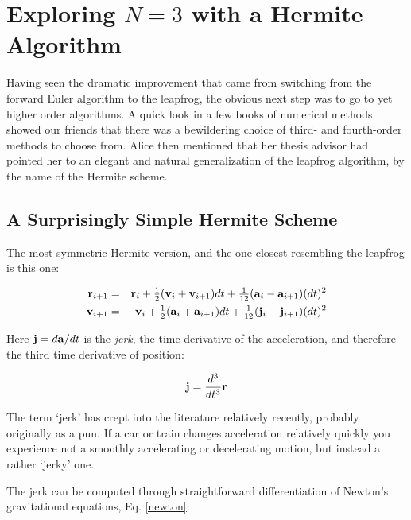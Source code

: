 \chapter{Exploring $N = 3$ with a Hermite Algorithm}

Having seen the dramatic improvement that came from switching from the
forward Euler algorithm to the leapfrog, the obvious next step was to
go to yet higher order algorithms.  A quick look in a few books of
numerical methods showed our friends that there was a bewildering
choice of third- and fourth-order methods to choose from.  Alice then
mentioned that her thesis advisor had pointed her to an elegant and
natural generalization of the leapfrog algorithm, by the name of the
Hermite scheme.

\section{A Surprisingly Simple Hermite Scheme}

The most symmetric Hermite version, and the one closest resembling the
leapfrog is this one:

\def\half{{\textstyle\frac{1}{2}}}
\def\quarter{{\textstyle\frac{1}{4}}}
\def\one#1{{\textstyle\frac{1}{#1}}}
\def\three#1{{\textstyle\frac{3}{#1}}}
\def\seven#1{{\textstyle\frac{7}{#1}}}

\begin{eqnarray}
\br_{i+1} & = & \br_i + \half(\bv_i + \bv_{i+1}) dt +
                \one{12}(\ba_i - \ba_{i+1})(dt)^2
                \label{hermite-step1} \\
\bv_{i+1} & = & \bv_i + \half(\ba_i + \ba_{i+1}) dt +
                \one{12}(\bj_i - \bj_{i+1})(dt)^2
                \label{hermite-step2}
\end{eqnarray}

Here ${\bf j} = d{\bf a}/dt$ is the {\it jerk}, the time derivative of the
acceleration, and therefore the third time derivative of position:

\begin{equation}
{\bf j} = \frac{d^3}{dt^3} {\bf r}
\end{equation}

The term `jerk' has crept into the literature relatively recently,
probably originally as a pun.  If a car or train changes acceleration
relatively quickly you experience not a smoothly accelerating or
decelerating motion, but instead a rather `jerky' one.

The jerk can be computed through straightforward differentiation of
Newton's gravitational equations, Eq. \ref{newton}:

